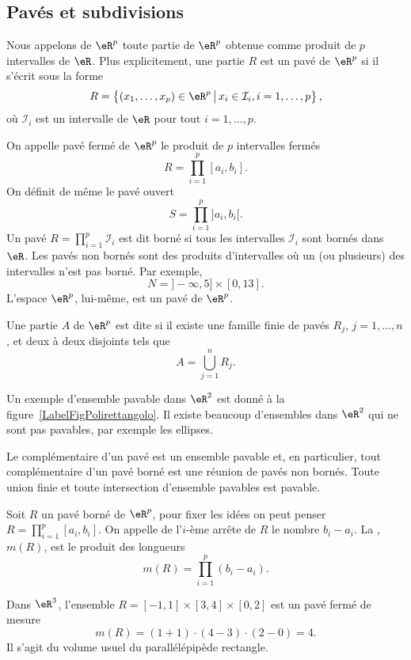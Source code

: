 \subsection{Pavés et subdivisions}

\begin{definition}
	Nous appelons  de \( \eR^p\) toute partie de \( \eR^p\) obtenue comme produit de \( p\) intervalles de \( \eR\). Plus explicitement, une partie \( R\) est un pavé de \( \eR^p\) si il s'écrit sous la forme
	\[
		R=\left\{(x_1,\ldots, x_p)\in\eR^p \,\big\vert\,x_i\in \mathcal{I}_i,  i=1,\ldots, p  \right\},
	\]
	où \( \mathcal{I}_i\) est un intervalle de \( \eR\) pour tout \( i=1,\ldots, p\).
\end{definition}
On appelle pavé fermé de \( \eR^p\) le produit de \( p\) intervalles fermés
\[
	R=\prod_{i=1}^{p}[a_i,b_i].
\]
On définit de même le pavé ouvert
\[
	S=\prod_{i=1}^{p}]a_i,b_i[.
\]
Un pavé \(  R=\prod_{i=1}^{p}\mathcal{I}_i\) est dit borné si tous les intervalles \( \mathcal{I}_i\) sont bornés dans \( \eR\). Les pavés non bornés sont des produits d'intervalles où un (ou plusieurs) des intervalles n'est pas borné. Par exemple,
\[
	N=]-\infty, 5]\times [0,13].
\]
L'espace \( \eR^p\), lui-même, est un pavé de \( \eR^p\).
\begin{definition}
	Une partie \( A\) de \( \eR^p\) est dite   si il existe une famille finie de pavés \( R_j\), \( j=1,\ldots, n\), et deux à deux disjoints tels que
	\[
		A=\bigcup_{j=1}^{n}R_j.
	\]
\end{definition}
Un exemple d'ensemble pavable dans \( \eR^2\) est donné à la figure~\ref{LabelFigPolirettangolo}. Il existe beaucoup d'ensembles dans \( \eR^2\) qui ne sont pas pavables, par exemple les ellipses.
\newcommand{\CaptionFigPolirettangolo}{Un ensemble pavable.}


Le complémentaire d'un pavé est  un ensemble pavable et, en particulier, tout complémentaire d'un pavé borné est une réunion de  pavés non bornés. Toute union finie et toute intersection d'ensemble pavables est pavable.
\begin{definition}
	Soit \( R\) un pavé borné de \( \eR^p\), pour fixer les idées on peut penser \( R=\prod_{i=1}^{p}[a_i,b_i]\). On appelle  de l'\( i\)-ème arrête de \( R\) le nombre \( b_i-a_i\). La , \( m(R)\), est le produit des longueurs
	\[
		m(R)=\prod_{i=1}^{p}(b_i-a_i).
	\]
\end{definition}
\begin{example}
	Dans \( \eR^3\), l'ensemble \( R=[-1,1]\times[3,4]\times[0,2]\) est un pavé fermé de mesure
	\[
		m(R)= (1+1)\cdot(4-3)\cdot(2-0)=4.
	\]
	Il s'agit du volume usuel du parallélépipède rectangle.
\end{example}


